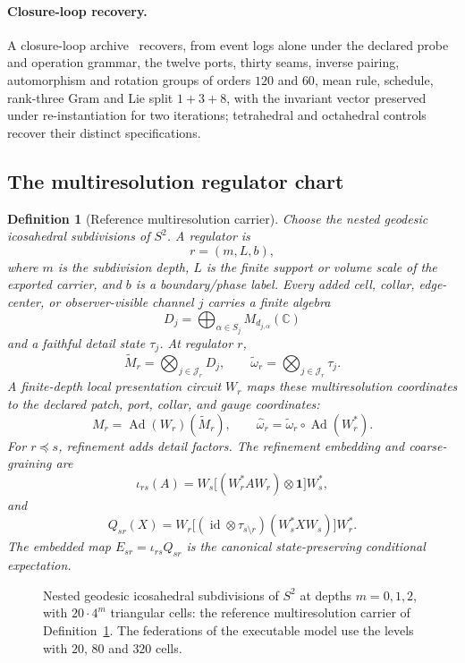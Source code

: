 \documentclass[11pt]{article}
\newtheorem{definition}[theorem]{Definition}
\theoremstyle{remark}
\theoremstyle{plain}
\begin{document}
\paragraph{Closure-loop recovery.}
A closure-loop archive~\cite{ophfpe}
recovers, from event logs alone under the declared probe and operation
grammar, the twelve ports, thirty seams, inverse pairing, automorphism and
rotation groups of orders \(120\) and \(60\), mean rule, schedule, rank-three
Gram and Lie split \(1+3+8\), with the invariant vector preserved under
re-instantiation for two iterations; tetrahedral and octahedral controls
recover their distinct specifications.

\subsection{The multiresolution regulator chart}

\begin{definition}[Reference multiresolution carrier]\label{def:microphysics-multiresolution-carrier}
Choose the nested geodesic icosahedral subdivisions of \(S^2\). A regulator is
\[
r=(m,L,b),
\]
where \(m\) is the subdivision depth, \(L\) is the finite support or volume scale of the exported
carrier, and \(b\) is a boundary/phase label. Every added cell, collar, edge-center, or
observer-visible channel \(j\) carries a finite algebra
\[
D_j=\bigoplus_{\alpha\in S_j}M_{d_{j,\alpha}}(\mathbb C)
\]
and a faithful detail state \(\tau_j\). At regulator \(r\),
\[
\widetilde M_r=\bigotimes_{j\in\mathcal J_r}D_j,\qquad
\widetilde\omega_r=\bigotimes_{j\in\mathcal J_r}\tau_j .
\]
A finite-depth local presentation circuit \(W_r\) maps these multiresolution coordinates to the
declared patch, port, collar, and gauge coordinates:
\[
M_r=\operatorname{Ad}(W_r)(\widetilde M_r),\qquad
\widehat\omega_r=\widetilde\omega_r\circ\operatorname{Ad}(W_r^*).
\]
For \(r\preceq s\), refinement adds detail factors. The refinement embedding and coarse-graining
are
\[
\iota_{rs}(A)=W_s\bigl[(W_r^*AW_r)\otimes\mathbf1\bigr]W_s^*,
\]
and
\[
Q_{sr}(X)=W_r\bigl[(\operatorname{id}\otimes\tau_{s\setminus r})
(W_s^*XW_s)\bigr]W_r^* .
\]
The embedded map \(E_{sr}=\iota_{rs}Q_{sr}\) is the canonical state-preserving conditional
expectation.
\end{definition}

\begin{figure}[!htb]
\centering

\caption{Nested geodesic icosahedral subdivisions of $S^2$ at depths $m=0,1,2$, with $20\cdot4^m$ triangular cells: the reference multiresolution carrier of Definition~\ref{def:microphysics-multiresolution-carrier}. The federations of the executable model use the levels with $20$, $80$ and $320$ cells.}
\label{fig:screen-levels}
\end{figure}
\end{document}

